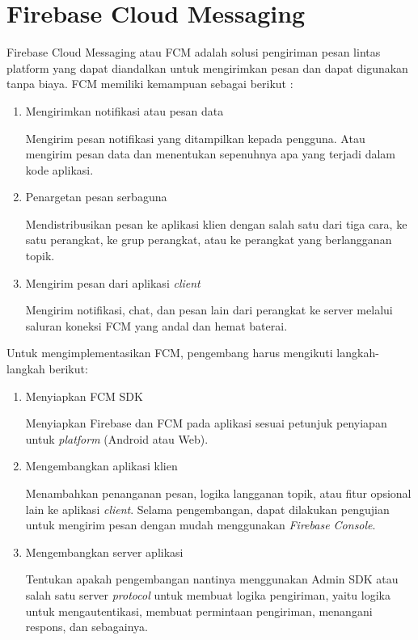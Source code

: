 \section{Firebase Cloud Messaging}
\par Firebase Cloud Messaging atau FCM adalah solusi pengiriman pesan lintas platform yang dapat diandalkan untuk mengirimkan pesan dan dapat digunakan tanpa biaya. FCM memiliki kemampuan sebagai berikut \cite{fcm-online}:
\begin{enumerate}[listparindent=2.5em]
	\item Mengirimkan notifikasi atau pesan data
	\par Mengirim pesan notifikasi yang ditampilkan kepada pengguna. Atau mengirim pesan data dan menentukan sepenuhnya apa yang terjadi dalam kode aplikasi.
	\item Penargetan pesan serbaguna
	\par Mendistribusikan pesan ke aplikasi klien dengan salah satu dari tiga cara, ke satu perangkat, ke grup perangkat, atau ke perangkat yang berlangganan topik.
	\item Mengirim pesan dari aplikasi \textit{client}
	\par Mengirim notifikasi, chat, dan pesan lain dari perangkat ke server melalui saluran koneksi FCM yang andal dan hemat baterai.
\end{enumerate}
\par Untuk mengimplementasikan FCM, pengembang harus mengikuti langkah-langkah berikut:
\begin{enumerate}[listparindent=2.5em]
	\item Menyiapkan FCM SDK
	\par Menyiapkan Firebase dan FCM pada aplikasi sesuai petunjuk penyiapan untuk \textit{platform} (Android atau Web).
	\item Mengembangkan aplikasi klien
	\par Menambahkan penanganan pesan, logika langganan topik, atau fitur opsional lain ke aplikasi \textit{client}. Selama pengembangan, dapat dilakukan pengujian untuk mengirim pesan dengan mudah menggunakan \textit{Firebase Console}.
	\item Mengembangkan server aplikasi
	\par Tentukan apakah pengembangan nantinya menggunakan Admin SDK atau salah satu server \textit{protocol} untuk membuat logika pengiriman, yaitu logika untuk mengautentikasi, membuat permintaan pengiriman, menangani respons, dan sebagainya.
\end{enumerate}
